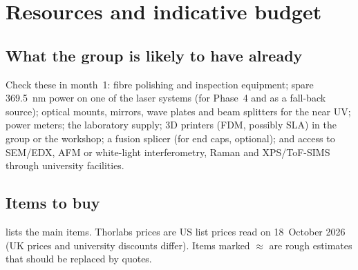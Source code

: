 \section{Resources and indicative budget}\label{sec:resources}

\subsection{What the group is likely to have already}
Check these in month~1: fibre polishing and inspection equipment; spare \SI{369.5}{nm} power on one of the
laser systems (for Phase~4 and as a fall-back source); optical mounts, mirrors, wave plates and beam
splitters for the near UV; power meters; the laboratory \Ntwo{} supply; 3D printers (FDM, possibly SLA)
in the group or the workshop; a fusion splicer (for end caps, optional); and access to SEM/EDX, AFM or
white-light interferometry, Raman and XPS/ToF-SIMS through university facilities.

\subsection{Items to buy}
 lists the main items. Thorlabs prices are US list prices read on 18~October 2026
(UK prices and university discounts differ). Items marked $\approx$ are rough estimates that should be
replaced by quotes.

